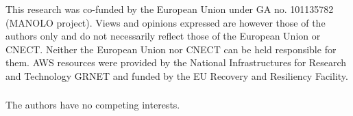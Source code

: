 \documentclass[runningheads]{llncs}
\begin{document}
\begin{credits}
  
\subsubsection{\ackname} This research was co-funded by the European Union
under GA no. 101135782 (MANOLO project). Views and opinions expressed
are however those of the authors only and do not necessarily reflect
those of the European Union or CNECT. Neither the European Union nor
CNECT can be held responsible for them. AWS resources were provided by
the National Infrastructures for Research and Technology GRNET and
funded by the EU Recovery and Resiliency Facility.

\subsubsection{\discintname} The authors have no competing
interests.
\end{credits}




\end{document}
